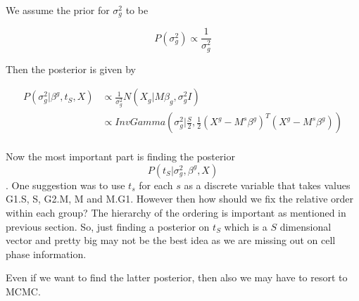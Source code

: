 \documentclass[11pt]{article}
\begin{document}
We assume the prior for $\sigma^2_{g}$ to be 

$$ P(\sigma^2_{g}) \propto \frac{1}{\sigma^2_{g}} $$

Then the posterior is given by 

\begin{align*}
P(\sigma^2_{g} | \beta^{g}, t_{S}, X) & \propto  \frac{1}{\sigma^2_{g}} N( X_{g} | M \beta_{g}, \sigma^2_{g} I)  \\
\qquad  &  \propto InvGamma \left ( \sigma^{2}_{g} | \frac{S}{2}, \frac{1}{2} (X^{g} - M^{s}\beta^{g})^{T} (X^{g} - M^{s}\beta^{g}) \right) \\
\end{align*}

Now the most important part is finding the posterior $$ P(t_S | \sigma^{2}_{g} , \beta^{g}, X) $$. One suggestion was to use $t_s$ for each $s$ as a discrete variable that takes values G1.S, S, G2.M, M and M.G1. However then how should we fix the relative order within each group? The hierarchy of the ordering is important as mentioned in previous section. So, just finding a posterior on  $t_S$  which is a $S$ dimensional vector and pretty big may not be the best idea as we are missing out on cell phase information.  

Even if we want to find the latter posterior, then also we may have to resort to MCMC. 
\end{document}
